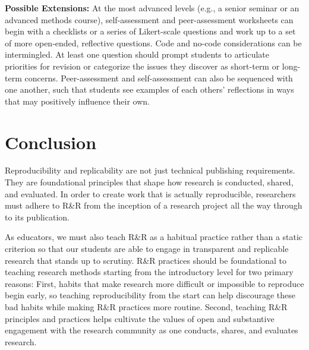 \documentclass[
  12pt]{article}
\begin{document}
\textbf{Possible Extensions:}
At the most advanced levels (e.g., a senior seminar or an advanced methods course), self-assessment and peer-assessment worksheets can begin with a checklists or a series of Likert-scale questions and work up to a set of more open-ended, reflective questions. 
Code and no-code considerations can be intermingled.
At least one question should prompt students to articulate priorities for revision or categorize the issues they discover as short-term or long-term concerns. 
Peer-assessment and self-assessment can also be sequenced with one another, such that students see examples of each others' reflections in ways that may positively influence their own.

\section{Conclusion}\label{sec-conc}

Reproducibility and replicability are not just technical publishing requirements.
They are foundational principles that shape how research is conducted, shared, and evaluated.
In order to create work that is actually reproducible, researchers must adhere to R\&R from the inception of a research project all the way through to its publication.

As educators, we must also teach R\&R as a habitual practice rather than a static criterion so that our students are able to engage in transparent and replicable research that stands up to scrutiny.
R\&R practices should be foundational to teaching research methods starting from the introductory level for two primary reasons:
First, habits that make research more difficult or impossible to reproduce begin early, so teaching reproducibility from the start can help discourage these bad habits while making R\&R practices more routine.
Second, teaching R\&R principles and practices helps cultivate the values of open and substantive engagement with the research community as one conducts, shares, and evaluates research.
\end{document}
